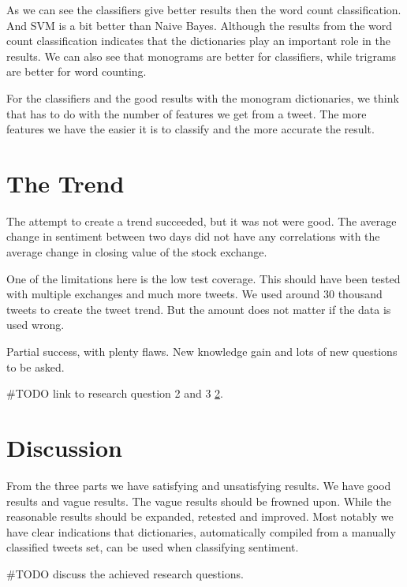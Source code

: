 As we can see the classifiers give better results then the word count
classification. And SVM is a bit better than Naive Bayes. Although the results
from the word count classification indicates that the dictionaries play an
important role in the results. We can also see that monograms are better for
classifiers, while trigrams are better for word counting.

For the classifiers and the good results with the monogram dictionaries, we
think
that has to do with the number of features we get from a tweet. The more
features we have the easier it is to classify and the more accurate the result.

%

\section{The Trend}\label{results:trend}
The attempt to create a trend succeeded, but it was not were good. The average
change in sentiment between two days did not have any correlations with the
average change in closing value of the stock exchange. 

One of the limitations here is the low test coverage. This should have been
tested with multiple exchanges and much more tweets. We used around 30 thousand
tweets to create the tweet trend. But the amount does not matter if the data is
used wrong.  

Partial success, with plenty flaws. New knowledge gain and lots of new
questions to be asked. 

#TODO link to research question 2 and 3 \ref{}.



%

\section{Discussion}
From the three parts we have satisfying and unsatisfying results. We have good
results and vague results. The vague results should be frowned upon. While the
reasonable results should be expanded, retested and improved. 
Most notably we have clear indications that dictionaries, automatically compiled
from a manually classified tweets set, can be used when classifying sentiment. 

#TODO discuss the achieved research questions. 
%
